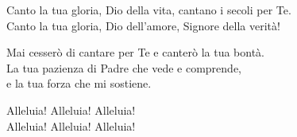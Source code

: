 
Canto la tua gloria, Dio della vita, cantano i secoli per Te.\\
Canto la tua gloria, Dio dell'amore, Signore della verità!

\spazio

Mai cesserò di cantare per Te e canterò la tua bontà.\\
La tua pazienza di Padre che vede e comprende,\\
e la tua forza che mi sostiene.

\spazio

Alleluia! Alleluia! Alleluia!\\
Alleluia! Alleluia! Alleluia!

